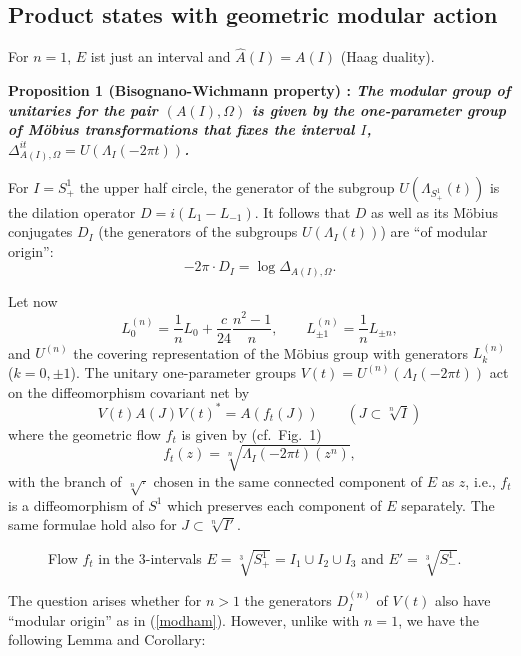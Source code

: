 \documentclass[12pt]{article}
\def\be{\begin{equation}} \def\bea{\begin{eqnarray}}
\def\ee{\end{equation}}\def\ea{\end{array}}
\begin{document}
\subsection{Product states with geometric modular action} 
\label{sec:prodstate} 

For $n=1$, $E$ ist just an interval and $\widehat A(I)=A(I)$ (Haag
duality). 

\medskip

{\bf Proposition 1 (Bisognano-Wichmann property) \rm \cite{GL}: 
  \sl The modular group of unitaries for the pair $(A(I),\Omega)$ is
  given by the one-parameter group of Möbius transformations that
  fixes the interval $I$, $\Delta_{A(I),\Omega}^{it}=U(\Lambda_I(-2\pi t))$.} 

\medskip

For $I=S^1_+$ the upper half circle, the
generator of the subgroup $U(\Lambda_{S^1_+}(t))$ is the dilation
operator $D = i(L_1-L_{-1})$. It follows that $D$ as well as its
Möbius conjugates $D_I$ (the generators of the subgroups
$U(\Lambda_{I}(t))$) are ``of modular origin'':
\be
\label{modham}
   -2\pi \cdot D_I = \log \Delta_{A(I),\Omega} .
\ee
 
Let now 
\be 
   L_0^{(n)}= \frac 1n L_{0}+\frac c{24}\frac{n^2-1}{n},\qquad
   L_{\pm1}^{(n)} = \frac 1n L_{\pm n},
\ee
and $U^{(n)}$ the covering representation of the
Möbius group with generators $L^{(n)}_k$ ($k=0,\pm 1$). The unitary
one-parameter groups $V(t)=U^{(n)}(\Lambda_I(-2\pi t))$ act on the
diffeomorphism covariant net by 
\be
\label{nflowimpl}
   V(t) A(J) V(t)^* = A(f_t(J)) \qquad (J\subset \sqrt[n]I)
\ee
where the geometric flow $f_t$ is given by (cf.\ Fig.\ 1)
\be
\label{nflow}
   f_t(z)=\sqrt[n]{\Lambda_I(-2\pi t)(z^n)},
\ee
with the branch of $\sqrt[n]{\cdot}$ chosen in the same connected
component of $E$ as $z$, i.e., $f_t$ is a diffeomorphism
of $S^1$ which preserves each component of $E$ separately. The same
formulae hold also for $J\subset \sqrt[n]{I'}$. 

\begin{figure}[htb*]

\hskip45mm  

\caption{\small Flow $f_t$ in the $3$-intervals 
$E=\sqrt[3]{S^1_+}=I_1\cup I_2\cup I_3$ 
and $E'=\sqrt[3]{S^1_-}$.}

\end{figure}

The question arises whether for $n>1$ the generators $D_I^{(n)}$ of
$V(t)$ also have ``modular origin'' as in (\ref{modham}). However,
unlike with $n=1$, we have the following Lemma and Corollary: 
\end{document}
